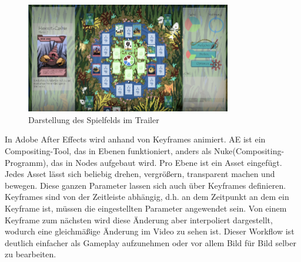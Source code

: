 \begin{figure}
\centering
\includegraphics[width=0.8\textwidth]{../img/video_spielfeld.PNG}
\caption{Darstellung des Spielfelds im Trailer}
\label{fig:Videodarstellung Spielfeld}
\end{figure}
In Adobe After Effects wird anhand von Keyframes animiert. AE ist ein Compositing-Tool, das in Ebenen funktioniert, anders als Nuke(Compositing-Programm), das in Nodes aufgebaut wird.
Pro Ebene ist ein Asset eingefügt. Jedes Asset lässt sich beliebig drehen, vergrößern, transparent machen und bewegen. Diese ganzen Parameter lassen sich auch über Keyframes definieren. Keyframes sind von der Zeitleiste abhängig, d.h. an dem Zeitpunkt an dem ein Keyframe ist, müssen die eingestellten Parameter angewendet sein. Von einem Keyframe zum nächsten wird diese Änderung aber interpoliert dargestellt, wodurch eine gleichmäßige Änderung im Video zu sehen ist.
Dieser Workflow ist deutlich einfacher als Gameplay aufzunehmen oder vor allem Bild für Bild selber zu bearbeiten.

